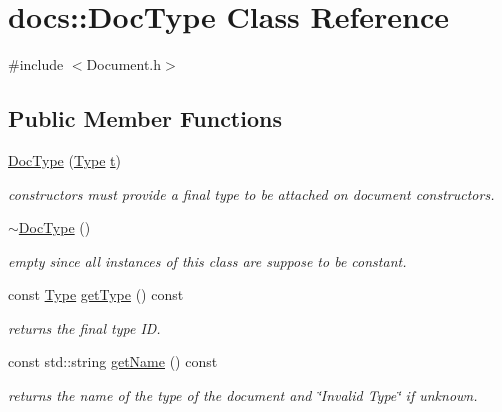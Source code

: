\hypertarget{classdocs_1_1DocType}{\section{docs\-:\-:Doc\-Type Class Reference}
\label{classdocs_1_1DocType}
}


{\ttfamily \#include $<$Document.\-h$>$}

\subsection*{Public Member Functions}
\begin{DoxyCompactItemize}
\item 
\hypertarget{classdocs_1_1DocType_a0ca0927d1a4d050487d9d14069afc050}{\hyperlink{classdocs_1_1DocType_a0ca0927d1a4d050487d9d14069afc050}{Doc\-Type} (\hyperlink{namespacedocs_a150efca62822b8ab62a5afabe299bf75}{Type} \hyperlink{classdocs_1_1DocType_a58ced824f3508e8f8d73b1ff1bfefc0a}{t})}\label{classdocs_1_1DocType_a0ca0927d1a4d050487d9d14069afc050}

\begin{DoxyCompactList}\small\item\em constructors must provide a final type to be attached on document constructors. \end{DoxyCompactList}\item 
\hypertarget{classdocs_1_1DocType_a931f25a0445c46eb7fba5c515124b728}{\hyperlink{classdocs_1_1DocType_a931f25a0445c46eb7fba5c515124b728}{$\sim$\-Doc\-Type} ()}\label{classdocs_1_1DocType_a931f25a0445c46eb7fba5c515124b728}

\begin{DoxyCompactList}\small\item\em empty since all instances of this class are suppose to be constant. \end{DoxyCompactList}\item 
\hypertarget{classdocs_1_1DocType_a1a7221ca7a1b44b1b115c81c469f6f75}{const \hyperlink{namespacedocs_a150efca62822b8ab62a5afabe299bf75}{Type} \hyperlink{classdocs_1_1DocType_a1a7221ca7a1b44b1b115c81c469f6f75}{get\-Type} () const }\label{classdocs_1_1DocType_a1a7221ca7a1b44b1b115c81c469f6f75}

\begin{DoxyCompactList}\small\item\em returns the final type I\-D. \end{DoxyCompactList}\item 
\hypertarget{classdocs_1_1DocType_a4632fc57ed71ebb984aa8dd78017db03}{const std\-::string \hyperlink{classdocs_1_1DocType_a4632fc57ed71ebb984aa8dd78017db03}{get\-Name} () const }\label{classdocs_1_1DocType_a4632fc57ed71ebb984aa8dd78017db03}

\begin{DoxyCompactList}\small\item\em returns the name of the type of the document and \char`\"{}\-Invalid Type\char`\"{} if unknown. \end{DoxyCompactList}\end{DoxyCompactItemize}

